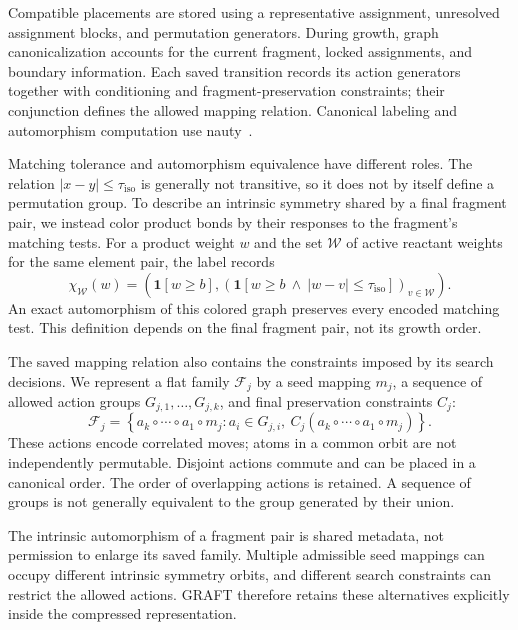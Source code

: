 Compatible placements are stored using a representative assignment, unresolved assignment blocks, and permutation generators. During growth, graph canonicalization accounts for the current fragment, locked assignments, and boundary information. Each saved transition records its action generators together with conditioning and fragment-preservation constraints; their conjunction defines the allowed mapping relation. Canonical labeling and automorphism computation use nauty~\citep{mckay2014}.

Matching tolerance and automorphism equivalence have different roles. The relation $|x-y|\leq\tau_{\mathrm{iso}}$ is generally not transitive, so it does not by itself define a permutation group. To describe an intrinsic symmetry shared by a final fragment pair, we instead color product bonds by their responses to the fragment's matching tests. For a product weight $w$ and the set $\mathcal W$ of active reactant weights for the same element pair, the label records
\begin{equation}
 \chi_{\mathcal W}(w)=\left(\mathbf 1[w\geq b],
 \left(\mathbf 1[w\geq b\ \land\ |w-v|\leq\tau_{\mathrm{iso}}]\right)_{v\in\mathcal W}\right).
 \label{eq:response}
\end{equation}
An exact automorphism of this colored graph preserves every encoded matching test. This definition depends on the final fragment pair, not its growth order.

The saved mapping relation also contains the constraints imposed by its search decisions. We represent a flat family $\mathcal F_j$ by a seed mapping $m_j$, a sequence of allowed action groups $G_{j,1},\ldots,G_{j,k}$, and final preservation constraints $C_j$:
\begin{equation}
 \mathcal F_j=\left\{a_k\circ\cdots\circ a_1\circ m_j:
 a_i\in G_{j,i},\ C_j(a_k\circ\cdots\circ a_1\circ m_j)\right\}.
 \label{eq:family}
\end{equation}
These actions encode correlated moves; atoms in a common orbit are not independently permutable. Disjoint actions commute and can be placed in a canonical order. The order of overlapping actions is retained. A sequence of groups is not generally equivalent to the group generated by their union.

The intrinsic automorphism of a fragment pair is shared metadata, not permission to enlarge its saved family. Multiple admissible seed mappings can occupy different intrinsic symmetry orbits, and different search constraints can restrict the allowed actions. GRAFT therefore retains these alternatives explicitly inside the compressed representation.

